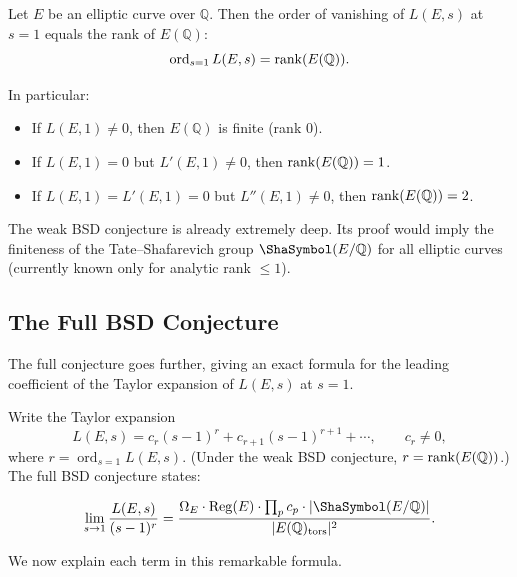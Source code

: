 \begin{conjecture}
\label{conj:weak-bsd}
Let $E$ be an elliptic curve over $\mathbb{Q}$. Then the order of vanishing of $L(E, s)$ at $s = 1$ equals the rank of $E(\mathbb{Q})$:
\[
\operatorname{ord}_{s=1} L(E, s) = \operatorname{rank}(E(\mathbb{Q})).
\]
\end{conjecture}

In particular:
\begin{itemize}
\item If $L(E, 1) \neq 0$, then $E(\mathbb{Q})$ is finite (rank 0).
\item If $L(E, 1) = 0$ but $L'(E, 1) \neq 0$, then $\operatorname{rank}(E(\mathbb{Q})) = 1$.
\item If $L(E, 1) = L'(E, 1) = 0$ but $L''(E, 1) \neq 0$, then $\operatorname{rank}(E(\mathbb{Q})) = 2$.
\end{itemize}

The weak BSD conjecture is already extremely deep. Its proof would imply the finiteness of the Tate--Shafarevich group $\Sha(E/\mathbb{Q})$ for all elliptic curves (currently known only for analytic rank $\le 1$).

\subsection{The Full BSD Conjecture}

The full conjecture goes further, giving an exact formula for the leading coefficient of the Taylor expansion of $L(E, s)$ at $s = 1$.

Write the Taylor expansion
\[
L(E, s) = c_r (s-1)^r + c_{r+1}(s-1)^{r+1} + \cdots, \qquad c_r \neq 0,
\]
where $r = \operatorname{ord}_{s=1} L(E, s)$. (Under the weak BSD conjecture, $r = \operatorname{rank}(E(\mathbb{Q}))$.) The full BSD conjecture states:

\begin{conjecture}
\label{conj:full-bsd}
\[
\lim_{s \to 1} \frac{L(E, s)}{(s-1)^r} = \frac{\Omega_E \cdot \operatorname{Reg}(E) \cdot \prod_p c_p \cdot |\Sha(E/\mathbb{Q})|}{|E(\mathbb{Q})_{\mathrm{tors}}|^2}.
\]
\end{conjecture}

We now explain each term in this remarkable formula.

